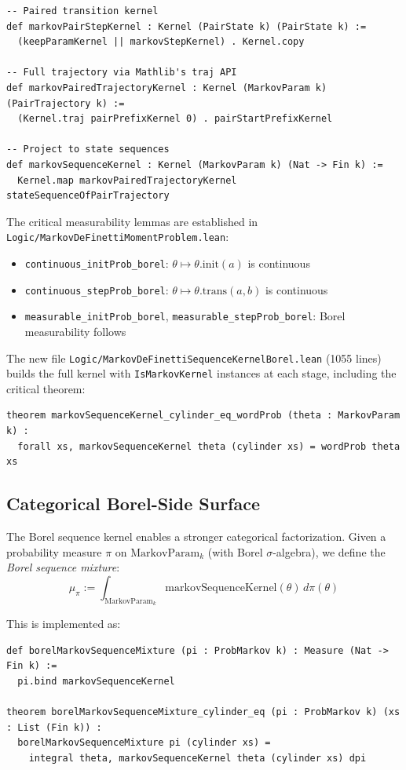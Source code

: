 \documentclass[11pt,a4paper]{article}
\theoremstyle{definition}
\begin{document}
\begin{lstlisting}
-- Paired transition kernel
def markovPairStepKernel : Kernel (PairState k) (PairState k) :=
  (keepParamKernel || markovStepKernel) . Kernel.copy

-- Full trajectory via Mathlib's traj API
def markovPairedTrajectoryKernel : Kernel (MarkovParam k) (PairTrajectory k) :=
  (Kernel.traj pairPrefixKernel 0) . pairStartPrefixKernel

-- Project to state sequences
def markovSequenceKernel : Kernel (MarkovParam k) (Nat -> Fin k) :=
  Kernel.map markovPairedTrajectoryKernel stateSequenceOfPairTrajectory
\end{lstlisting}

The critical measurability lemmas are established in
\texttt{Logic/MarkovDeFinettiMomentProblem.lean}:
\begin{itemize}
\item \texttt{continuous\_initProb\_borel}: $\theta \mapsto \theta.\mathrm{init}(a)$ is continuous
\item \texttt{continuous\_stepProb\_borel}: $\theta \mapsto \theta.\mathrm{trans}(a,b)$ is continuous
\item \texttt{measurable\_initProb\_borel}, \texttt{measurable\_stepProb\_borel}: Borel measurability follows
\end{itemize}

The new file \texttt{Logic/MarkovDeFinettiSequenceKernelBorel.lean} (1055 lines)
builds the full kernel with \texttt{IsMarkovKernel} instances at each stage,
including the critical theorem:
\begin{lstlisting}
theorem markovSequenceKernel_cylinder_eq_wordProb (theta : MarkovParam k) :
  forall xs, markovSequenceKernel theta (cylinder xs) = wordProb theta xs
\end{lstlisting}

\subsection{Categorical Borel-Side Surface}

The Borel sequence kernel enables a stronger categorical factorization. Given
a probability measure $\pi$ on $\mathrm{MarkovParam}_k$ (with Borel
$\sigma$-algebra), we define the \emph{Borel sequence mixture}:
\[
\mu_\pi := \int_{\mathrm{MarkovParam}_k} \mathrm{markovSequenceKernel}(\theta)\, d\pi(\theta)
\]

This is implemented as:
\begin{lstlisting}
def borelMarkovSequenceMixture (pi : ProbMarkov k) : Measure (Nat -> Fin k) :=
  pi.bind markovSequenceKernel

theorem borelMarkovSequenceMixture_cylinder_eq (pi : ProbMarkov k) (xs : List (Fin k)) :
  borelMarkovSequenceMixture pi (cylinder xs) =
    integral theta, markovSequenceKernel theta (cylinder xs) dpi
\end{lstlisting}
\end{document}
